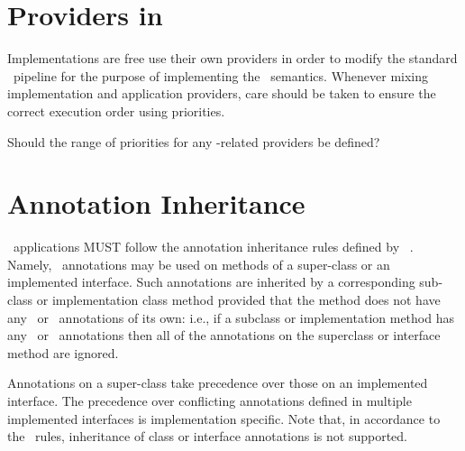\section{Providers in \mvc}
\label{providers_in_mvc}

Implementations are free use their own providers in order to modify the standard 
\jaxrs\ pipeline for the purpose of implementing the \mvc\ semantics. Whenever mixing 
implementation and application providers, care should be taken to ensure the correct 
execution order using priorities.

\begin{ednote}
Should the range of priorities for any \mvc -related providers be defined?
\end{ednote}

\section{Annotation Inheritance}
\label{annotation_inheritance}

\mvc\  applications MUST follow the annotation inheritance rules defined by \jaxrs\ 
. Namely, \mvc\ annotations may be used on methods of a 
super-class or an implemented interface. Such annotations are inherited 
by a corresponding sub-class or implementation class method provided that the method does 
not have any \mvc\ or \jaxrs\ annotations of its own: 
i.e., if a subclass or implementation method has any \mvc\ or \jaxrs\ annotations then all of the
annotations on the superclass or interface method are ignored.

Annotations on a super-class take precedence over those on an implemented interface. The
precedence over conflicting annotations defined in multiple implemented interfaces is implementation 
specific. Note that, in accordance to the \jaxrs\ rules, inheritance of class or interface annotations 
is not supported. 
